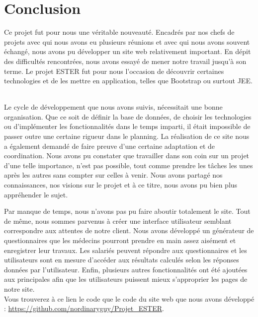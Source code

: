 \chapter*{Conclusion}

Ce projet fut pour nous une véritable nouveauté. Encadrés par nos chefs de projets avec qui nous avons eu plusieurs réunions et avec qui nous avons souvent échangé, nous avons pu développer un site web relativement important. En dépit des difficultés rencontrées, nous avons essayé de mener notre travail jusqu'à son terme. Le projet ESTER fut pour nous l'occasion de découvrir certaines technologies et de les mettre en application, telles que Bootstrap ou surtout JEE. \ 

Le cycle de développement que nous avons suivis, nécessitait une bonne organisation. Que ce soit de définir la base de données, de choisir les technologies ou d'implémenter les fonctionnalités dans le temps imparti, il était impossible de passer outre une certaine rigueur dans le planning. La réalisation de ce site nous a également demandé de faire preuve d'une certaine adaptation et de coordination. Nous avons pu constater que travailler dans son coin sur un projet d'une telle importance, n'est pas possible, tout comme prendre les tâches les unes après les autres sans compter sur celles à venir. Nous avons partagé nos connaissances, nos visions sur le projet et à ce titre, nous avons pu bien plus appréhender le sujet. \

Par manque de temps, nous n'avons pas pu faire aboutir totalement le site. Tout de même, nous sommes parvenus à créer une interface utilisateur semblant correspondre aux attentes de notre client. Nous avons développé un générateur de questionnaires que les médecins pourront prendre en main assez aisément et enregistrer leur travaux. Les salariés peuvent répondre aux questionnaires et les utilisateurs sont en mesure d'accéder aux résultats calculés selon les réponses données par l'utilisateur. Enfin, plusieurs autres fonctionnalités ont été ajoutées aux principales afin que les utilisateurs puissent mieux s'approprier les pages de notre site. \\


Vous trouverez à ce lien le code que le code du site web que nous avons développé : \url{https://github.com/nordinaryguy/Projet_ESTER}.